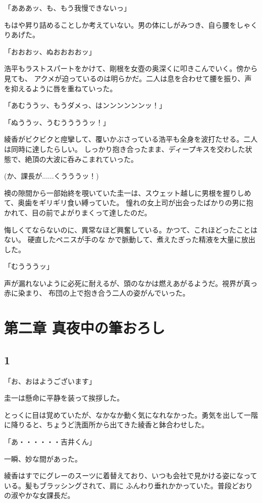 ﻿\documentclass[book,tate]{jlreq}
\begin{document}
「あああッ、も、もう我慢できないっ」

もはや昇り詰めることしか考えていない。男の体にしがみつき、自ら腰をしゃくりあげた。

「おおおッ、ぬおおおおッ」

浩平もラストスパートをかけて、剛根を女壺の奥深くに叩きこんでいく。傍から見ても、
アクメが迫っているのは明らかだ。二人は息を合わせて腰を振り、声を抑えるように唇を重ねていった。

「あむううッ、もうダメっ、はンンンンンンッ！」

「ぬううッ、うむううううッ！」

綾香がビクビクと痙攣して、覆いかぶさっている浩平も全身を波打たせる。二人は同時に達したらしい。
しっかり抱き合ったまま、ディープキスを交わした状態で、絶頂の大波に呑みこまれていった。

(か、課長が......くうううッ！)

襖の隙間から一部始終を覗いていた圭一は、スウェット越しに男根を握りしめて、奥歯をギリギリ食い縛っていた。
憧れの女上司が出会ったばかりの男に抱かれて、目の前でよがりまくって達したのだ。

悔しくてならないのに、異常なほど興奮している。かつて、これほどったことはない。
硬直したペニスが手のな かで脈動して、煮えたぎった精液を大量に放出した。

「むうううッ」

声が漏れないように必死に耐えるが、頭のなかは燃えあがるようだ。視界が真っ赤に染まり、
布団の上で抱き合う二人の姿がんでいった。

\chapter{第二章 真夜中の筆おろし}

\section*{1}

「お、おはようございます」

圭一は懸命に平静を装って挨拶した。

とっくに目は覚めていたが、なかなか動く気になれなかった。勇気を出して一階に降りると、ちょうど洗面所から出てきた綾香と鉢合わせした。

「あ・・・・・・吉井くん」

一瞬、妙な間があった。

綾香はすでにグレーのスーツに着替えており、いつも会社で見かける姿になっている。髪もブラッシングされて、肩に ふんわり垂れかかっていた。普段どおりの淑やかな女課長だ。
\end{document}
